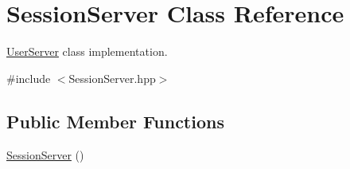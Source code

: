 \hypertarget{classSessionServer}{
\section{SessionServer Class Reference}
\label{classSessionServer}
}


\hyperlink{classUserServer}{UserServer} class implementation.  




{\ttfamily \#include $<$SessionServer.hpp$>$}

\subsection*{Public Member Functions}
\begin{DoxyCompactItemize}
\item 
\hypertarget{classSessionServer_a8a473b02addc08564c164faa1ea77575}{
\hyperlink{classSessionServer_a8a473b02addc08564c164faa1ea77575}{SessionServer} ()}
\label{classSessionServer_a8a473b02addc08564c164faa1ea77575}


\end{DoxyCompactItemize}
